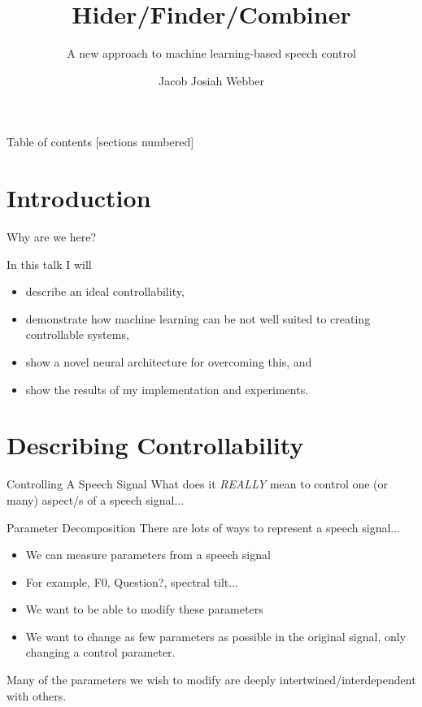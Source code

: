 \documentclass[10pt]{beamer}
\title{Hider/Finder/Combiner}
\subtitle{A new approach to machine learning-based speech control}
\date{}
\author{Jacob Josiah Webber}
\institute{Centre for Speech Technology Research}
\begin{document}
\maketitle

\begin{frame}{Table of contents}
  [sections numbered]
  \tableofcontents[hideallsubsections]
\end{frame}

\section{Introduction}

\begin{frame}[fragile]{Why are we here?}

In this talk I will
\begin{itemize}
    \item describe an ideal controllability,
    \item demonstrate how machine learning can be not well suited to creating controllable systems,
    \item show a novel neural architecture for overcoming this, and
    \item show the results of my implementation and experiments.
\end{itemize}
\end{frame}

\section{Describing Controllability}

\begin{frame}{Controlling A Speech Signal}
What does it \emph{REALLY} mean to control one (or many) aspect/s of a speech signal...
\end{frame}

\begin{frame}{Parameter Decomposition}
There are lots of ways to represent a speech signal...
\begin{itemize}
    \item We can measure parameters from a speech signal
    \item For example, F0, Question?, spectral tilt...
    \item We want to be able to modify these parameters
    \item We want to change as few parameters as possible in the original signal, only changing a control parameter.
\end{itemize}{}
Many of the parameters we wish to modify are deeply intertwined/interdependent with others.
\end{frame}{}
\end{document}
